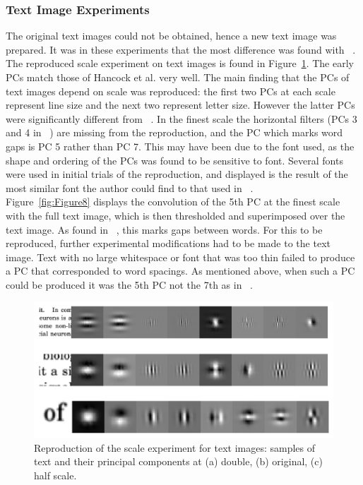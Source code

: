 \subsubsection{Text Image Experiments}
The original text images could not be obtained, hence a new text image was prepared. It was in these experiments that the most difference was found with ~\cite{Hancock1992-mp}.\\
The reproduced scale experiment on text images is found in Figure~\ref{fig:Figure7}. The early PCs match those of Hancock et al. very well. The main finding that the PCs of text images depend on scale was reproduced: the first two PCs at each scale represent line size and the next two represent letter size. However the latter PCs were significantly different from ~\cite{Hancock1992-mp}. In the finest scale the horizontal filters (PCs 3 and 4 in ~\cite{Hancock1992-mp}) are missing from the reproduction, and the PC which marks word gaps is PC 5 rather than PC 7. This may have been due to the font used, as the shape and ordering of the PCs was found to be sensitive to font. Several fonts were used in initial trials of the reproduction, and displayed is the result of the most similar font the author could find to that used in ~\cite{Hancock1992-mp}.\\
Figure~\ref{fig:Figure8} displays the convolution of the 5th PC at the finest scale with the full text image, which is then thresholded and superimposed over the text image. As found in ~\cite{Hancock1992-mp}, this marks gaps between words. For this to be reproduced, further experimental modifications had to be made to the text image. Text with no large whitespace or font that was too thin failed to produce a PC that corresponded to word spacings. As mentioned above, when such a PC could be produced it was the 5th PC not the 7th as in ~\cite{Hancock1992-mp}. 
\begin{figure}
    \centering
    \includegraphics[scale=0.55]{figures/Figure7.png}
    \caption{Reproduction of the scale experiment for text images: samples of text and their principal components at (a) double, (b) original, (c) half scale.}
    \label{fig:Figure7}
\end{figure}
